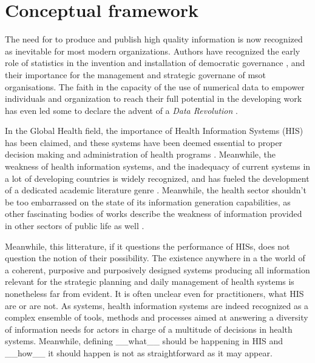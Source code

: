 \section{Conceptual framework}

The need for to produce and publish high quality information is now recognized as inevitable for most modern organizations. Authors have recognized the early role of statistics in the invention and installation of democratic governance \cite{porter_trust_1996}, and their importance for the management and strategic governane of msot organisations. The faith in the capacity of the use of numerical data to empower individuals and organization to reach their full potential in the developing work has even led some to declare the advent of a \textit{Data Revolution}\cite{independent_expert_group_on_a_data_revolution_for_sustainable_development_world_2014} \cite{center_for_global_development_delivering_2014}.

In the Global Health field, the importance of Health Information Systems (HIS) has been claimed, and these systems have been deemed essential to proper decision making and administration of health programs \cite{abou-zahr_health_2005}. Meanwhile, the weakness of health information systems, and the inadequacy of current systems in a lot of  developing countries is widely recognized, and has fueled the development of a dedicated academic literature genre \cite{abou-zahr_better_2010} \cite{kiberu_strengthening_2014}. Meanwhile, the health sector shouldn't be too embarrassed on the state of its information generation capabilities, as other fascinating bodies of works describe the weakness of information provided in other sectors of public life as well \cite{jerven_poor_2013}.

Meanwhile, this litterature, if it questions the performance of HISs, does not question the notion of their possibility. The existence anywhere in a the world of a coherent, purposive and purposively designed systems producing all information relevant for the strategic planning and daily management of health systems is nonetheless far from evident. It is often unclear even for practitioners, what HIS are or are not. As systems, health information systems are indeed recognized as a complex ensemble of tools, methods and processes aimed at answering a diversity of information needs for actors in charge of a multitude of decisions in health systems. Meanwhile, defining __what__ should be happening in HIS and __how__ it should happen is not as straightforward as it may appear.


